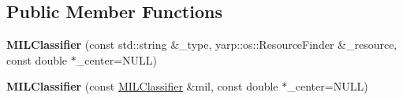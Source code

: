 \subsection*{Public Member Functions}
\begin{DoxyCompactItemize}
\item 
{\bfseries M\+I\+L\+Classifier} (const std\+::string \&\+\_\+type, yarp\+::os\+::\+Resource\+Finder \&\+\_\+resource, const double $\ast$\+\_\+center=N\+U\+L\+L)\label{classiCub_1_1boostMIL_1_1MILClassifier_aa10bb74388d664e0871b75339c0323c4}

\item 
{\bfseries M\+I\+L\+Classifier} (const \hyperlink{classiCub_1_1boostMIL_1_1MILClassifier}{M\+I\+L\+Classifier} \&mil, const double $\ast$\+\_\+center=N\+U\+L\+L)\label{classiCub_1_1boostMIL_1_1MILClassifier_aae97d263eb21483392c60417b56c6a33}


\end{DoxyCompactItemize}
